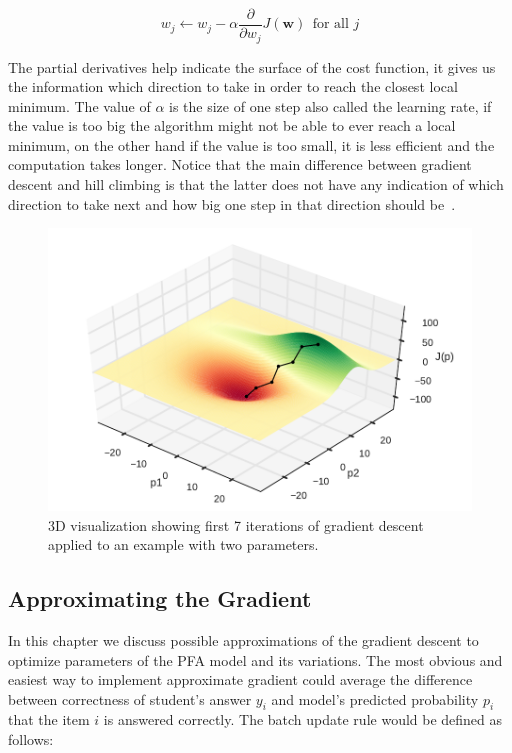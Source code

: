 \begin{equation} \label{cost-function-update}
  w_j \gets w_j - \alpha \frac{\partial}{\partial w_j} J(\mathbf{w})~~\text{for all } j
\end{equation}

The partial derivatives help indicate the surface of the cost function, it gives us the information which direction to take in order to reach the closest local minimum. The value of $\alpha$ is the size of one step also called the learning rate, if the value is too big the algorithm might not be able to ever reach a local minimum, on the other hand if the value is too small, it is less efficient and the computation takes longer. Notice that the main difference between gradient descent and hill climbing is that the latter does not have any indication of which direction to take next and how big one step in that direction should be~\cite{Russell2009}.

\begin{figure}[htbp]
  \centering
  \includegraphics[width=\textwidth]{img/gradient-descent}
  \caption{3D visualization showing first 7 iterations of gradient descent applied to an example with two parameters.}
  \label{fig-gradient-descent}
\end{figure}

\subsection{Approximating the Gradient}

In this chapter we discuss possible approximations of the gradient descent to optimize parameters of the PFA model and its variations. The most obvious and easiest way to implement approximate gradient could average the difference between correctness of student's answer $y_i$ and model's predicted probability $p_i$ that the item $i$ is answered correctly. The batch update rule would be defined as follows:

